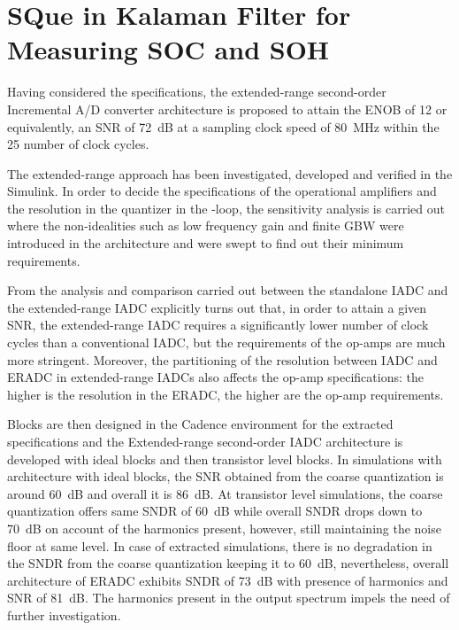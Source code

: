 \chapter{SQue in Kalaman Filter for Measuring SOC and SOH }

Having considered the specifications, the extended-range second-order Incremental A/D converter architecture is proposed to attain the ENOB of 12 or equivalently, an SNR of 72~dB at a sampling clock speed of 80~MHz within the 25 number of clock cycles.

The extended-range approach has been investigated, developed and verified in the Simulink. In order to decide the specifications of the operational amplifiers and the resolution in the quantizer in the \textSigma \textDelta -loop, the sensitivity analysis is carried out where the non-idealities such as low frequency gain and finite GBW were introduced in the architecture and were swept to find out their minimum requirements. 

From the analysis and comparison carried out between the standalone IADC and the extended-range IADC explicitly turns out that, in order to attain a given SNR, the extended-range IADC requires a significantly lower number of clock cycles than a conventional IADC, but the requirements of the op-amps are much more stringent. Moreover, the partitioning of the resolution between IADC and ERADC in extended-range IADCs also affects the op-amp specifications: the higher is the resolution in the ERADC, the higher are the op-amp requirements.

Blocks are then designed in the Cadence environment for the extracted specifications and the Extended-range second-order IADC architecture is developed with ideal blocks and then transistor level blocks. In simulations with architecture with ideal blocks, the SNR obtained from the coarse quantization is around 60~dB and overall it is 86~dB. At transistor level simulations, the coarse quantization offers same SNDR of 60~dB while overall SNDR drops down to 70~dB on account of the harmonics present, however, still maintaining the noise floor at same level. In case of extracted simulations, there is no degradation in the SNDR from the coarse quantization keeping it to 60~dB, nevertheless, overall architecture of ERADC exhibits SNDR of 73~dB with presence of harmonics and SNR of 81~dB. The harmonics present in the output spectrum impels the need of further investigation. 

